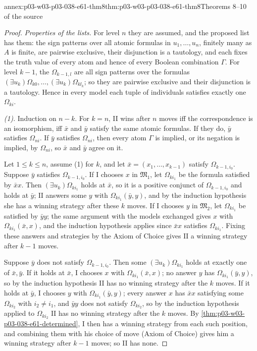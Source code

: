 \begin{annexitem}{annex:p03-w03-p03-038-e61-thm8}{thm:p03-w03-p03-038-e61-thm8}{Theorems 8--10 of the source}
\begin{proof}
\emph{Properties of the lists.} For level \(n\) they are assumed, and the
proposed list has them: the sign patterns over all atomic formulas in
\(u_1,\ldots,u_n\), finitely many as \(A\) is finite, are pairwise
exclusive, their disjunction is a tautology, and each fixes the truth value
of every atom and hence of every Boolean combination \(\Gamma\). For level
\(k-1\), the \(\Omega_{k-1,l}\) are all sign patterns over the formulas
\((\exists u_k)\Omega_{k0},\ldots,(\exists u_k)\Omega_{kl_k}\); so they are
pairwise exclusive and their disjunction is a tautology. Hence in every
model each tuple of individuals satisfies exactly one \(\Omega_{ki}\).

\emph{(1).} Induction on \(n-k\). For \(k=n\), II wins after \(n\) moves iff
the correspondence is an isomorphism, iff \(\bar x\) and \(\bar y\)
satisfy the same atomic formulas. If they do, \(\bar y\) satisfies
\(\Omega_{ni}\). If \(\bar y\) satisfies \(\Omega_{ni}\), then every atom
\(\Gamma\) is implied, or its negation is implied, by \(\Omega_{ni}\), so
\(\bar x\) and \(\bar y\) agree on it.

Let \(1\le k\le n\), assume (1) for \(k\), and let
\(\bar x=(x_1,\ldots,x_{k-1})\) satisfy \(\Omega_{k-1,i_0}\). Suppose
\(\bar y\) satisfies \(\Omega_{k-1,i_0}\). If I chooses \(x\) in
\(\mathfrak M_1\), let \(\Omega_{ki_1}\) be the formula satisfied by
\(\bar xx\). Then \((\exists u_k)\Omega_{ki_1}\) holds at \(\bar x\), so it
is a positive conjunct of \(\Omega_{k-1,i_0}\) and holds at \(\bar y\); II
answers some \(y\) with \(\Omega_{ki_1}(\bar y,y)\), and by the induction
hypothesis she has a winning strategy after these \(k\) moves. If I chooses
\(y\) in \(\mathfrak M_2\), let \(\Omega_{ki_1}\) be satisfied by
\(\bar yy\); the same argument with the models exchanged gives \(x\) with
\(\Omega_{ki_1}(\bar x,x)\), and the induction hypothesis applies since
\(\bar xx\) satisfies \(\Omega_{ki_1}\). Fixing these answers and
strategies by the Axiom of Choice gives II a winning strategy after
\(k-1\) moves.

Suppose \(\bar y\) does not satisfy \(\Omega_{k-1,i_0}\). Then some
\((\exists u_k)\Omega_{ki_1}\) holds at exactly one of \(\bar x,\bar y\).
If it holds at \(\bar x\), I chooses \(x\) with \(\Omega_{ki_1}(\bar x,x)\);
no answer \(y\) has \(\Omega_{ki_1}(\bar y,y)\), so by the induction
hypothesis II has no winning strategy after the \(k\) moves. If it holds at
\(\bar y\), I chooses \(y\) with \(\Omega_{ki_1}(\bar y,y)\); every answer
\(x\) has \(\bar xx\) satisfying some \(\Omega_{ki_2}\) with
\(i_2\ne i_1\), and \(\bar yy\) does not satisfy \(\Omega_{ki_2}\), so by
the induction hypothesis applied to \(\Omega_{ki_2}\) II has no winning
strategy after the \(k\) moves. By
\cref{thm:p03-w03-p03-038-e61-determined}, I then has a winning strategy
from each such position, and combining them with his choice of move
(Axiom of Choice) gives him a winning strategy after \(k-1\) moves; so II
has none.


\end{proof}
\end{annexitem}
